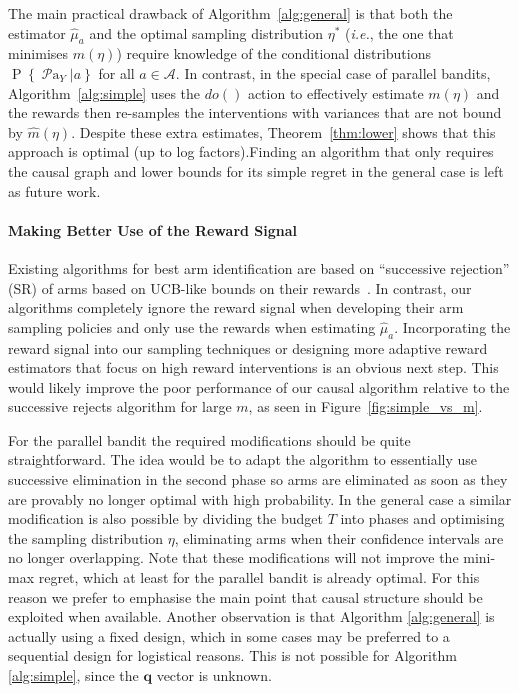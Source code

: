 \documentclass[11pt,a4paper,oneside]{book}
\newcommand{\Pn}[2]{\operatorname{P}\left\{#2|#1\right\}}
\newcommand{\calA}{\mathcal A}
\newcommand{\ie}{\textit{i.e.}}
\newcommand{\parents}[1]{\operatorname{\mathcal{P}a}_{#1}}
\renewcommand{\vec}[1]{\boldsymbol{#1}}
\theoremstyle{plain}
\theoremstyle{definition}
\begin{document}
The main practical drawback of Algorithm~\ref{alg:general} is that both the estimator $\hat{\mu}_a$ and the optimal sampling distribution $\eta^*$ (\ie, the one that minimises $m(\eta)$) require knowledge of the conditional distributions $\Pn{a}{\parents{Y}}$ for all $a \in \calA$. In contrast, in the special case of parallel bandits, Algorithm~\ref{alg:simple} uses the $do()$ action to effectively estimate $m(\eta)$ and the rewards then re-samples the interventions with variances that are not bound by $\hat{m}(\eta)$.
Despite these extra estimates, Theorem~\ref{thm:lower} shows that this approach is optimal (up to log factors).Finding an algorithm that only requires the causal graph and lower bounds for its simple regret in the general case is left as future work.


\paragraph{Making Better Use of the Reward Signal}
Existing algorithms for best arm identification are based on ``successive rejection'' (SR) of arms based on UCB-like bounds on their rewards~\citep{Even-Dar2002}. In contrast, our algorithms completely ignore the reward signal when developing their arm sampling policies and only use the rewards when estimating $\hat{\mu}_a$. Incorporating the reward signal into our sampling techniques or designing more adaptive reward estimators that focus on high reward interventions is an obvious next step. This would likely improve the poor performance of our causal algorithm relative to the successive rejects algorithm for large $m$, as seen in Figure~\ref{fig:simple_vs_m}.

For the parallel bandit the required modifications should be quite straightforward. The idea would be to adapt the algorithm to essentially use successive elimination in the second phase so arms are eliminated as soon as they are provably no longer optimal with high probability. In the general case a similar modification is also possible by dividing the budget $T$ into phases and optimising the sampling distribution $\eta$, eliminating arms when their confidence intervals are no longer overlapping. Note that these modifications will not improve the mini-max regret, which at least for the parallel bandit is already optimal. For this reason we prefer to emphasise the main point that causal structure should be exploited when available. Another observation is that Algorithm \ref{alg:general} is actually using a fixed design, which in some cases may be preferred to a sequential design for logistical reasons. This is not possible for Algorithm \ref{alg:simple}, since the $\vec{q}$ vector is unknown.
\end{document}

